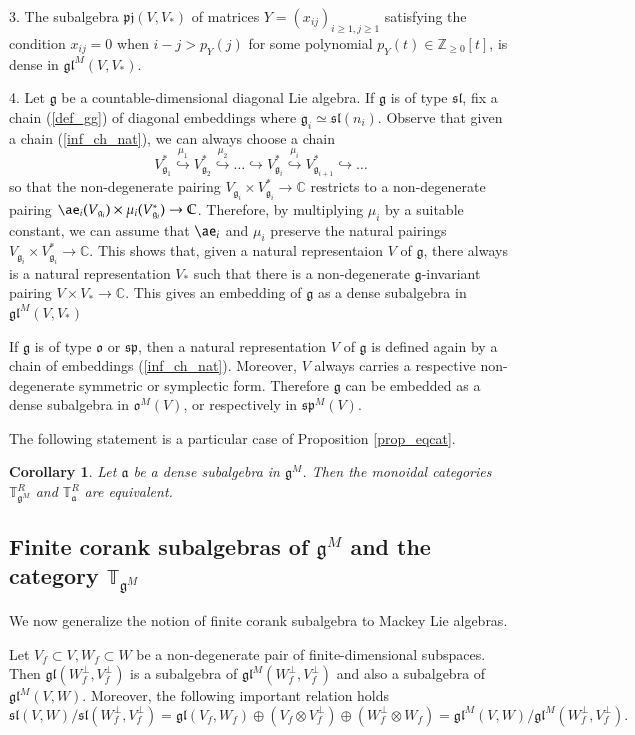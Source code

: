 \documentclass[10pt]{amsart}
\newcounter{theorem}
\newtheorem{corollary}[theo]{Corollary}
\newcommand {\ZZ} {\mathbb {Z}}
\newcommand {\CC} {\mathbb {C}}
\newcommand{\TT}{\mathbb{T}}
\renewcommand{\sp}{\mathfrak{sp}}
\renewcommand{\sl}{\mathfrak{sl}}
\newcommand{\oj}{\mathfrak{g}}
\newcommand{\oo}{\mathfrak{o}}
\renewcommand{\aa}{\mathfrak{a}}
\renewcommand{\gg}{\mathfrak{g}}
\newcommand{\gl}{\mathfrak{gl}}
\begin{document}
3.  The subalgebra $\mathfrak{pj}(V,V_*)$ of matrices $Y=(x_{ij})_{i\geq1,j\geq1}$ satisfying the condition $x_{ij}=0$ when 
$i-j>p_Y(j)$ for some polynomial $p_Y(t) \in \ZZ_{\geq0}[t]$, is dense in $\gl^M(V,V_*)$.

4. Let $\gg$ be a countable-dimensional diagonal Lie algebra. If $\gg$ is of type $\sl$,  
fix a chain (\ref{def_gg}) of diagonal embeddings where $\gg_i \simeq \sl(n_i)$. Observe that given a chain (\ref{inf_ch_nat}), we can always choose a chain
$$V^*_{\oj_{1}} \stackrel{\mu_1}{\hookrightarrow} V^*_{\oj_{2}} \stackrel{\mu_2}{\hookrightarrow}  \dots \hookrightarrow V^*_{\oj_{i}} \stackrel{\mu_i}{\hookrightarrow} V^*_{\oj_{i+1}} \hookrightarrow \dots$$ so that the non-degenerate pairing 
$V_{\oj_i} \times V^*_{\oj_i} \rightarrow \CC$ restricts to a non-degenerate pairing $\ae_i(V_{\oj_i}) \times \mu_i(V^*_{\oj_i}) \rightarrow \CC$. 
Therefore, by multiplying $\mu_i$ by a suitable constant, we can assume that $\ae_i$ and $\mu_i$ preserve the natural pairings 
$V_{\oj_i} \times V^*_{\oj_i} \rightarrow \CC$. 
This shows that, given a natural representaion $V$ of $\gg$, there always is a natural representation $V_*$ such that there is a non-degenerate $\oj$-invariant pairing $V \times V_* \rightarrow \CC$. 
This gives an embedding of $\gg$ as a dense subalgebra in $\gl^M(V,V_*)$


If $\gg$ is of type $\oo$ or $\sp$, then a natural representation $V$ of $\gg$ is defined again by a chain of embeddings (\ref{inf_ch_nat}). Moreover, $V$ always carries a respective non-degenerate symmetric or symplectic form. Therefore $\gg$ can be embedded as a dense subalgebra in $\oo^M(V)$, or respectively in $\sp^M(V)$. 

The following statement is a particular case of Proposition \ref{prop_eqcat}. 

\begin{corollary}\label{prop_squot} Let $\aa$ be a dense subalgebra in $\gg^M$. Then the monoidal categories $\TT^R_{\gg^M}$ and $\TT^R_{\aa}$ are equivalent.
\end{corollary}

\subsection {Finite corank subalgebras of $\gg^M$ and the category $\TT_{\gg^M}$}\label{sect:7.3} 
We now generalize the notion of finite corank subalgebra to Mackey Lie algebras.

Let $V_f\subset V, W_f\subset W$ be a non-degenerate pair of finite-dimensional subspaces. Then $\gl(W_f^\perp,V_f^\perp)$ is a subalgebra of $\gl^M(W_f^\perp,V_f^\perp)$ and also a subalgebra of   
$\gl^M(V,W)$. Moreover, the following important relation holds
\begin{equation}\label{gl}
\sl(V,W)/\sl(W_f^\perp,V_f^\perp)=\gl(V_f,W_f)\oplus (V_f\otimes V_f^\perp) \oplus (W_f^\perp\otimes W_f) = \gl^M(V,W)/\gl^M(W_f^\perp,V_f^\perp).
\end{equation} 
\end{document}
